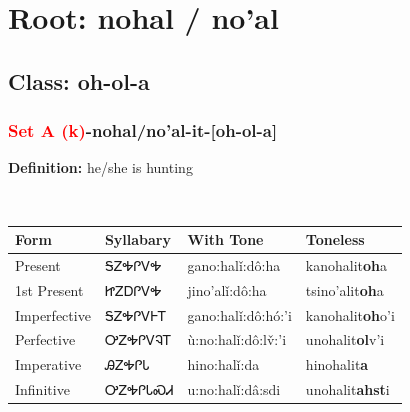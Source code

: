 \needspace{4in}
\section*{Root: nohal / no'al}
\nopagebreak
{}
\needspace{3in}
\subsection*{Class: oh-ol-a}
\nopagebreak
\needspace{2in}
\subsubsection*{\textcolor{Red}{Set A (k)}{-}\textbf{nohal/no'al}{-}it{-}[oh-ol-a]}
\nopagebreak
\textbf{Definition: } he/she is hunting
\\[0.5em]
\begin{tabularx}{\textwidth}{l X X X}%
\toprule%
\textbf{Form}&\textbf{Syllabary}&\textbf{With Tone}&\textbf{Toneless}\\%
\midrule%
Present&ᎦᏃᎭᎵᏙᎭ&gano:halǐ:dô:ha&kanohalit\textbf{oh}a\\%
1st Present&ᏥᏃᎠᎵᏙᎭ&jino’alǐ:dô:ha&tsino'alit\textbf{oh}a\\%
Imperfective&ᎦᏃᎭᎵᏙᎰᎢ&gano:halǐ:dô:hó:’i&kanohalit\textbf{oh}o'i\\%
Perfective&ᎤᏃᎭᎵᏙᎸᎢ&ù:no:halǐ:dô:lv̌:’i&unohalit\textbf{ol}v'i\\%
Imperative&ᎯᏃᎭᎵᏓ&hino:halǐ:da&hinohalit\textbf{a}\\%
Infinitive&ᎤᏃᎭᎵᏓᏍᏗ&u:no:halǐ:dâ:sdi&unohalit\textbf{ahst}i\\%
\bottomrule%
\end{tabularx}
\\[1em]